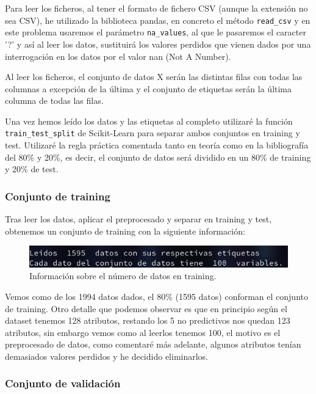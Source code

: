 \documentclass[12pt, spanish]{article}
\begin{document}
Para leer los ficheros, al tener el formato de fichero CSV (aunque la extensión no sea CSV), he utilizado la biblioteca pandas, en concreto el método \texttt{read\_csv}\cite{pandasReadCSV} y en este problema usaremos el parámetro \texttt{na\_values}, al que le pasaremos el caracter '?' y así al leer los datos, sustituirá los valores perdidos que vienen dados por una interrogación en los datos por el valor nan (Not A Number).

Al leer los ficheros, el conjunto de datos X serán las distintas filas con todas las columnas a excepción de la última y el conjunto de etiquetas serán la última columna de todas las filas.


Una vez hemos leído los datos y las etiquetas al completo utilizaré la función \texttt{train\_test\_split} de Scikit-Learn para separar ambos conjuntos en training y test. Utilizaré la regla práctica comentada tanto en teoría\cite{teoria} como en la bibliografía\cite{libro} del 80\% y 20\%, es decir, el conjunto de datos será dividido en un 80\% de training y 20\% de test.

\subsubsection{Conjunto de training}

Tras leer los datos, aplicar el preprocesado y separar en training y test, obtenemos un conjunto de training con la siguiente información:

\begin{figure}[H]
	\centering
	\includegraphics[scale=0.7]{regresion/num_datos.png}
	\caption{Información sobre el número de datos en training.}
	\label{datosReg}
\end{figure}

Vemos como de los 1994 datos dados, el 80\% (1595 datos) conforman el conjunto de training. Otro detalle que podemos observar es que en principio según el dataset tenemos 128 atributos, restando los 5 no predictivos nos quedan 123 atributos, sin embargo vemos como al leerlos tenemos 100, el motivo es el preprocesado de datos, como comentaré más adelante, algunos atributos tenían demasiados valores perdidos y he decidido eliminarlos.

\subsubsection{Conjunto de validación}
\end{document}

